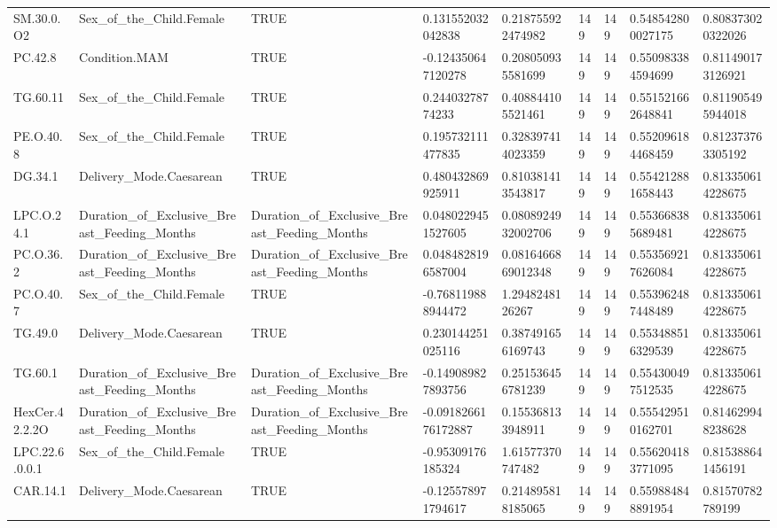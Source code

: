 \begin{longtable}{lllllllll}
SM.30.0.O2 & Sex\_of\_the\_Child.Female & TRUE & 0.131552032042838 & 0.218755922474982 & 149 & 149 & 0.548542800027175 & 0.808373020322026 \\
PC.42.8 & Condition.MAM & TRUE & -0.124350647120278 & 0.208050935581699 & 149 & 149 & 0.550983384594699 & 0.811490173126921 \\
TG.60.11 & Sex\_of\_the\_Child.Female & TRUE & 0.24403278774233 & 0.408844105521461 & 149 & 149 & 0.551521662648841 & 0.811905495944018 \\
PE.O.40.8 & Sex\_of\_the\_Child.Female & TRUE & 0.195732111477835 & 0.328397414023359 & 149 & 149 & 0.552096184468459 & 0.812373763305192 \\
DG.34.1 & Delivery\_Mode.Caesarean & TRUE & 0.480432869925911 & 0.810381413543817 & 149 & 149 & 0.554212881658443 & 0.813350614228675 \\
LPC.O.24.1 & Duration\_of\_Exclusive\_Breast\_Feeding\_Months & Duration\_of\_Exclusive\_Breast\_Feeding\_Months & 0.0480229451527605 & 0.0808924932002706 & 149 & 149 & 0.553668385689481 & 0.813350614228675 \\
PC.O.36.2 & Duration\_of\_Exclusive\_Breast\_Feeding\_Months & Duration\_of\_Exclusive\_Breast\_Feeding\_Months & 0.0484828196587004 & 0.0816466869012348 & 149 & 149 & 0.553569217626084 & 0.813350614228675 \\
PC.O.40.7 & Sex\_of\_the\_Child.Female & TRUE & -0.768119888944472 & 1.2948248126267 & 149 & 149 & 0.553962487448489 & 0.813350614228675 \\
TG.49.0 & Delivery\_Mode.Caesarean & TRUE & 0.230144251025116 & 0.387491656169743 & 149 & 149 & 0.553488516329539 & 0.813350614228675 \\
TG.60.1 & Duration\_of\_Exclusive\_Breast\_Feeding\_Months & Duration\_of\_Exclusive\_Breast\_Feeding\_Months & -0.149089827893756 & 0.251536456781239 & 149 & 149 & 0.554300497512535 & 0.813350614228675 \\
HexCer.42.2.2O & Duration\_of\_Exclusive\_Breast\_Feeding\_Months & Duration\_of\_Exclusive\_Breast\_Feeding\_Months & -0.0918266176172887 & 0.155368133948911 & 149 & 149 & 0.555429510162701 & 0.814629948238628 \\
LPC.22.6.0.0.1 & Sex\_of\_the\_Child.Female & TRUE & -0.95309176185324 & 1.61577370747482 & 149 & 149 & 0.556204183771095 & 0.815388641456191 \\
CAR.14.1 & Delivery\_Mode.Caesarean & TRUE & -0.125578971794617 & 0.214895818185065 & 149 & 149 & 0.559884848891954 & 0.81570782789199 \\

\end{longtable}
